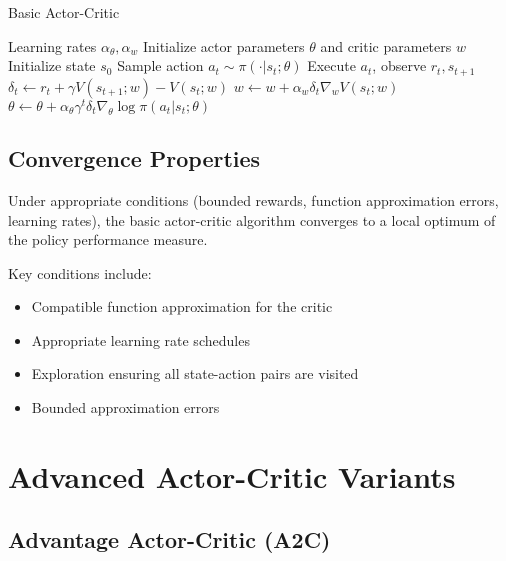 \begin{algorithm}
\caption{Basic Actor-Critic}
\begin{algorithmic}
\REQUIRE Learning rates $\alpha_\theta, \alpha_w$
\STATE Initialize actor parameters $\theta$ and critic parameters $w$
    \STATE Initialize state $s_0$
        \STATE Sample action $a_t \sim \pi(\cdot|s_t; \theta)$
        \STATE Execute $a_t$, observe $r_t, s_{t+1}$
        \STATE $\delta_t \leftarrow r_t + \gamma V(s_{t+1}; w) - V(s_t; w)$ 
        \STATE $w \leftarrow w + \alpha_w \delta_t \nabla_w V(s_t; w)$ 
        \STATE $\theta \leftarrow \theta + \alpha_\theta \gamma^t \delta_t \nabla_\theta \log \pi(a_t|s_t; \theta)$ 
    \ENDFOR
\ENDFOR
\end{algorithmic}
\end{algorithm}

\subsection{Convergence Properties}

\begin{theorem}
Under appropriate conditions (bounded rewards, function approximation errors, learning rates), the basic actor-critic algorithm converges to a local optimum of the policy performance measure.
\end{theorem}

Key conditions include:
\begin{itemize}
    \item Compatible function approximation for the critic
    \item Appropriate learning rate schedules
    \item Exploration ensuring all state-action pairs are visited
    \item Bounded approximation errors
\end{itemize}

\section{Advanced Actor-Critic Variants}

\subsection{Advantage Actor-Critic (A2C)}

